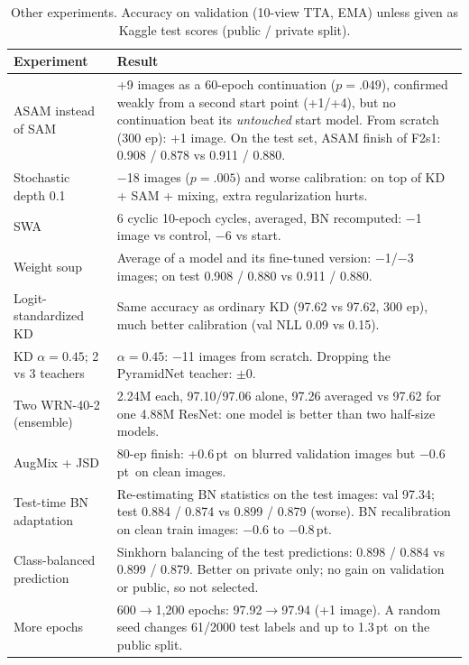 \documentclass[10pt]{article}
\newcommand{\pt}{\,pt}
\begin{document}
\begin{table}[t]
\centering\small
\caption{Other experiments. Accuracy on validation (10-view TTA, EMA) unless given as Kaggle test scores (public / private split).}
\label{tab:neg}
\begin{tabularx}{\linewidth}{lX}
\toprule
Experiment & Result\\
\midrule
ASAM \cite{kwon2021asam} instead of SAM & +9 images as a 60-epoch continuation ($p{=}.049$), confirmed weakly from a second start point (+1/+4),
but no continuation beat its \emph{untouched} start model. From scratch (300 ep): +1 image. On the test set, ASAM finish of F2s1: 0.908 / 0.878 vs 0.911 / 0.880.\\
Stochastic depth 0.1 \cite{huang2016deep} & $-$18 images ($p{=}.005$) and worse calibration: on top of KD + SAM + mixing, extra regularization hurts.\\
SWA \cite{izmailov2018swa} & 6 cyclic 10-epoch cycles, averaged, BN recomputed: $-$1 image vs control, $-$6 vs start.\\
Weight soup \cite{wortsman2022soups} & Average of a model and its fine-tuned version: $-$1/$-$3 images; on test 0.908 / 0.880 vs 0.911 / 0.880.\\
Logit-standardized KD \cite{sun2024logit} & Same accuracy as ordinary KD (97.62 vs 97.62, 300 ep), much better calibration (val NLL 0.09 vs 0.15).\\
KD $\alpha{=}0.45$; 2 vs 3 teachers & $\alpha{=}0.45$: $-$11 images from scratch. Dropping the PyramidNet teacher: $\pm$0.\\
Two WRN-40-2 (ensemble) & 2.24M each, 97.10/97.06 alone, 97.26 averaged vs 97.62 for one 4.88M ResNet: one model is better than two half-size models.\\
AugMix + JSD \cite{hendrycks2020augmix} & 80-ep finish: +0.6\pt\ on blurred validation images but $-$0.6\pt\ on clean images.\\
Test-time BN adaptation & Re-estimating BN statistics on the test images: val 97.34; test 0.884 / 0.874 vs 0.899 / 0.879 (worse). BN recalibration on clean train images: $-$0.6 to $-$0.8\pt.\\
Class-balanced prediction & Sinkhorn balancing \cite{cuturi2013sinkhorn} of the test predictions: 0.898 / 0.884 vs 0.899 / 0.879. Better on private only;
no gain on validation or public, so not selected.\\
More epochs & 600$\to$1,200 epochs: 97.92$\to$97.94 (+1 image). A random seed changes 61/2000 test labels and up to 1.3\pt\ on the public split.\\
\bottomrule
\end{tabularx}
\end{table}
\end{document}
